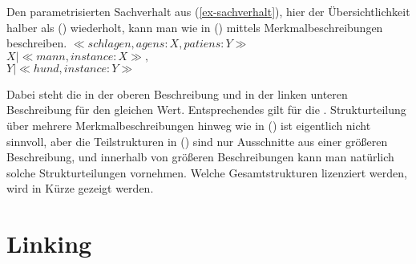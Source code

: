 Den parametrisierten Sachverhalt aus (\ref{ex-sachverhalt}), hier der Übersichtlichkeit
halber als () wiederholt, kann man wie in () mittels Merkmalbeschreibungen beschreiben.
\ea
\label{ex-sachverhalt-zwei}
$\ll schlagen, agens:X, patiens:Y\gg$\\
$X|\ll mann, instance:X\gg,$\\
$Y|\ll hund, instance:Y\gg$
\z
\ea
{}
\bigskip

\hspace{1.5cm}
\z
Dabei steht die  in der oberen Beschreibung und in der linken unteren Beschreibung
für den gleichen Wert. Entsprechendes gilt für die . Strukturteilung über mehrere Merkmalbeschreibungen
hinweg wie in () ist eigentlich nicht sinnvoll, aber die Teilstrukturen in () sind 
nur Ausschnitte aus einer größeren Beschreibung, und innerhalb von größeren Beschreibungen kann man natürlich solche Strukturteilungen
vornehmen. Welche Gesamtstrukturen lizenziert werden, wird in Kürze gezeigt werden.

\section{Linking}
\label{sec-linking}


